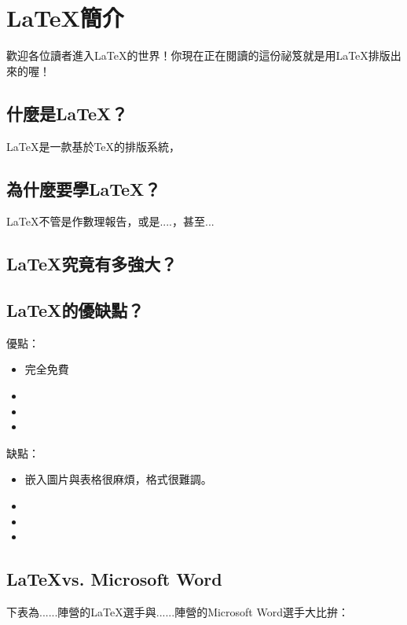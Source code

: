 \documentclass[14pt, a4paper, oneside]{extbook}
\let\tmpLaTeX\LaTeX
\renewcommand{\LaTeX}{\textrm{\tmpLaTeX}}
\begin{document}
			
			
		
		
		
		
		
	\chapter{\LaTeX 簡介}
		歡迎各位讀者進入\LaTeX 的世界！你現在正在閱讀的這份祕笈就是用\LaTeX 排版出來的喔！
	\section{什麼是\LaTeX ？}
		\LaTeX 是一款基於\TeX 的排版系統，
	\section{為什麼要學\LaTeX ？}
		\LaTeX 不管是作數理報告，或是....，甚至...
	\section{\LaTeX 究竟有多強大？}
		
	\section{\LaTeX 的優缺點？}
		優點：
		\begin{itemize}
			\item 完全免費
			\item 
			\item 
			\item 
		\end{itemize}
			
		缺點：
		\begin{itemize}
			\item 嵌入圖片與表格很麻煩，格式很難調。
			\item 
			\item 
			\item 		
		\end{itemize}

	\section{\LaTeX vs. Microsoft Word}
		下表為......陣營的\LaTeX 選手與......陣營的Microsoft Word選手大比拚：
		
\end{document}
